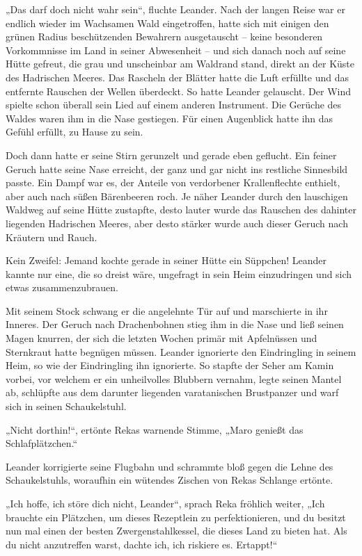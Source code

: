 „Das darf doch nicht wahr sein“, fluchte Leander. Nach der langen Reise war er endlich wieder im Wachsamen Wald eingetroffen, hatte sich mit einigen den grünen Radius beschützenden Bewahrern ausgetauscht – keine besonderen Vorkommnisse im Land in seiner Abwesenheit – und sich danach noch auf seine Hütte gefreut, die grau und unscheinbar am Waldrand stand, direkt an der Küste des Hadrischen Meeres. Das Rascheln der Blätter hatte die Luft erfüllte und das entfernte Rauschen der Wellen überdeckt. So hatte Leander gelauscht. Der Wind spielte schon überall sein Lied auf einem anderen Instrument. Die Gerüche des Waldes waren ihm in die Nase gestiegen. Für einen Augenblick hatte ihn das Gefühl erfüllt, zu Hause zu sein.

Doch dann hatte er seine Stirn gerunzelt und gerade eben geflucht. Ein feiner Geruch hatte seine Nase erreicht, der ganz und gar nicht ins restliche Sinnesbild passte. Ein Dampf war es, der Anteile von verdorbener Krallenflechte enthielt, aber auch nach süßen Bärenbeeren roch. Je näher Leander durch den lauschigen Waldweg auf seine Hütte zustapfte, desto lauter wurde das Rauschen des dahinter liegenden Hadrischen Meeres, aber desto stärker wurde auch dieser Geruch nach Kräutern und Rauch.

Kein Zweifel: Jemand kochte gerade in seiner Hütte ein Süppchen! Leander kannte nur eine, die so dreist wäre, ungefragt in sein Heim einzudringen und sich etwas zusammenzubrauen.

Mit seinem Stock schwang er die angelehnte Tür auf und marschierte in ihr Inneres. Der Geruch nach Drachenbohnen stieg ihm in die Nase und ließ seinen Magen knurren, der sich die letzten Wochen primär mit Apfelnüssen und Sternkraut hatte begnügen müssen. Leander ignorierte den Eindringling in seinem Heim, so wie der Eindringling ihn ignorierte. So stapfte der Seher am Kamin vorbei, vor welchem er ein unheilvolles Blubbern vernahm, legte seinen Mantel ab, schlüpfte aus dem darunter liegenden varatanischen Brustpanzer und warf sich in seinen Schaukelstuhl.

„Nicht dorthin!“, ertönte Rekas warnende Stimme, „Maro genießt das Schlafplätzchen.“

Leander korrigierte seine Flugbahn und schrammte bloß gegen die Lehne des Schaukelstuhls, woraufhin ein wütendes Zischen von Rekas Schlange ertönte.

„Ich hoffe, ich störe dich nicht, Leander“, sprach Reka fröhlich weiter, „Ich brauchte ein Plätzchen, um dieses Rezeptlein zu perfektionieren, und du besitzt nun mal einen der besten Zwergenstahlkessel, die dieses Land zu bieten hat. Als du nicht anzutreffen warst, dachte ich, ich riskiere es. Ertappt!“

